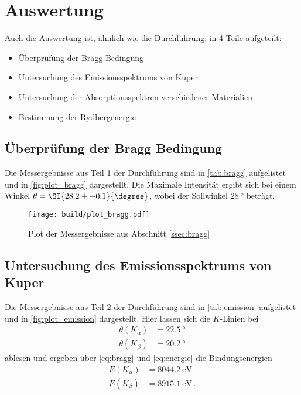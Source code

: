 \newpage
\section{Auswertung}
\label{sec:Auswertung}



Auch die Auswertung ist, ähnlich wie die Durchführung, in 4 Teile aufgeteilt:
\begin{itemize}
    \item Überprüfung der Bragg Bedingung
    \item Untersuchung des Emissionsspektrums von Kuper
    \item Untersuchung der Absorptionsspektren verschiedener Materialien
    \item Bestimmung der Rydbergenergie
\end{itemize}



\subsection{Überprüfung der Bragg Bedingung}
\label{ssec:bragg_auswertung}

Die Messergebnisse aus Teil 1 der Durchführung sind in \autoref{tab:bragg} aufgelistet und in \autoref{fig:plot_bragg} dargestellt.
Die Maximale Intensität ergibt sich bei einem Winkel $\theta=\SI{28.2+-0.1}{\degree}$, wobei der Sollwinkel $\SI{28}{\degree}$ beträgt.

\begin{figure}
    \centering
    \texttt{[image: build/plot\_bragg.pdf]}
    \caption{Plot der Messergebnisse aus Abschnitt \ref{ssec:bragg}}
    \label{fig:plot_bragg}
\end{figure}



\subsection{Untersuchung des Emissionsspektrums von Kuper}
\label{ssec:emission_auswertung}

Die Messergebnisse aus Teil 2 der Durchführung sind in \autoref{tab:emission} aufgelistet und in \autoref{fig:plot_emission} dargestellt.
Hier lassen sich die $K$-Linien bei
\begin{align*}
    \theta(K_\alpha) &= \SI{22.5}{\degree} \\
    \theta(K_\beta) &= \SI{20.2}{\degree}
\end{align*}
ablesen und ergeben über \autoref{eq:bragg} und \ref{eq:energie} die Bindungsenergien
\begin{align*}
    E(K_\alpha) &= \SI{8044.2}{\electronvolt} \\
    E(K_\beta) &= \SI{8915.1}{\electronvolt} \,.
\end{align*}

